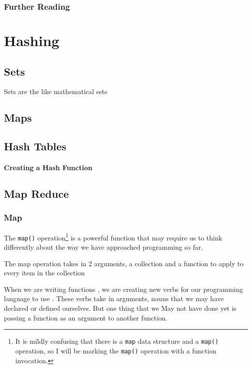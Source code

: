 \documentclass[10pt,a4paper]{book}
\begin{document}
\section{Further Reading}

\part{Hashing}

\chapter{Sets}
Sets are the like mathematical sets


\chapter{Maps}
\chapter{Hash Tables}
\subsection{Creating a Hash Function}



\chapter{Map Reduce}


\section{Map}
The \texttt{map()} operation\footnote{It is mildly confusing that there is a \texttt{map} data structure and a \texttt{map()} operation, so I will be marking the \texttt{map()} operation with a function invocation.} is a powerful function that may require us to think  differently about the way we have approached programming so far.

The map operation takes in 2 arguments, a collection and a function to apply to every item in the collection




When we are writing functions , we are creating new verbs for our programming language to use . These verbs take in arguments, nouns that we may have declared or defined ourselves. But one thing that we May not have done yet is passing a function as an argument to another function.
\end{document}
